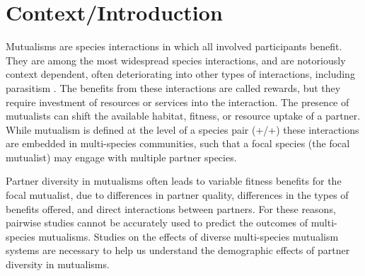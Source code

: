 \documentclass[12pt,a4paper]{article}
\begin{document}
\section*{Context/Introduction}

Mutualisms are species interactions in which all involved participants benefit. They are among the most widespread species interactions\cite{Chamberlain2014, BoucherDouglasH.1985}, and are notoriously context dependent\cite{Bronstein1994,Chamberlain2014,Frederickson2013}, often deteriorating into other types of interactions, including parasitism \cite{Rodriguez-Rodriguez2017,Song2020,Mandyam2014,Thrall2007, Bahia2022}.
The benefits from these interactions are called rewards, but they require investment of resources or services into the interaction\cite{Bronstein2001}.
The presence of mutualists can shift the available habitat, fitness, or resource uptake of a partner\cite{Stachowicz2001,West2007}.
While mutualism is defined at the level of a species pair (+/+) these interactions are embedded in multi-species communities, such that a focal species (the focal mutualist) may engage with multiple partner species\cite{Stanton2013, Boucher1982}.

Partner diversity in mutualisms often leads to variable fitness benefits for the focal mutualist\cite{Afkhami2014, Palmer2010}, due to differences in partner quality\cite{Bascompte2019,Stanton2013,Frederickson2013,Jones2015, Ness2006}, differences in the types of benefits offered\cite{Kiers2003,Afkhami2014}, and direct interactions between partners\cite{Sun2019,Heath2009,Heath2014,Grutter2003}.
For these reasons, pairwise studies cannot be accurately used to predict the outcomes of multi-species mutualisms\cite{Palmer2010, Stanton2013, Chamberlain2014, Song2020}.
Studies on the effects of diverse multi-species mutualism systems are necessary to help us understand the demographic effects of partner diversity in mutualisms\cite{Bascompte2019}. 
\end{document}
